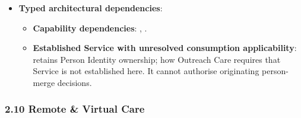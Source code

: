 \begin{itemize}
\begin{itemize}
\begin{itemize}
\item
\emph{Exposed Service}: \texttt{} — Reconciles batch clinical encounters upon network reconnection.



\end{itemize}


\end{itemize}


\item
\textbf{Typed architectural dependencies}:


\begin{itemize}

\item
\textbf{Capability dependencies}: \texttt{}, \texttt{}.



\item
\textbf{Established Service with unresolved consumption applicability}: \texttt{} retains Person Identity ownership; how Outreach Care requires that Service is not established here. It cannot authorise originating person-merge decisions.



\end{itemize}


\end{itemize}
\label{rad:sd:216}

\par\smallskip
{}\label{rad:sd:218}



\label{rad:sd:220}
\subsubsection*{2.10 Remote \& Virtual Care}
\label{rad:sd:221}


